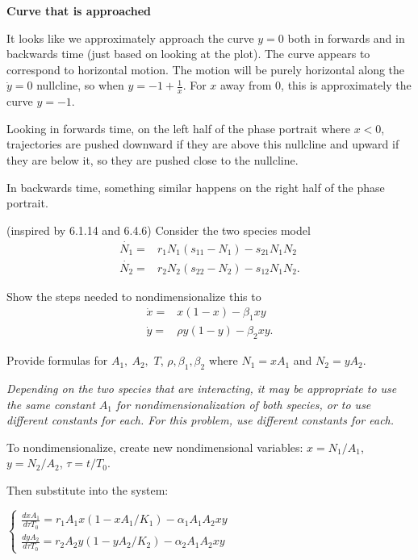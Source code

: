 \documentclass[12pt,letterpaper]{exam}
\begin{document}
\begin{questions}
\begin{parts}
\begin{solution}
\textbf{Curve that is approached}

It looks like we approximately approach the curve $y=0$ both in forwards and in backwards time (just based on looking at the plot).  The curve appears to correspond to horizontal motion.  The motion will be purely horizontal along the $\dot{y} = 0$ nullcline, so when $y = -1 + \frac{1}{x}$.  For $x$ away from $0$, this is approximately the curve $y = -1$.

Looking in forwards time, on the left half of the phase portrait where $ x < 0$, trajectories are pushed downward if they are above this nullcline and upward if they are below it, so they are pushed close to the nullcline.  

In backwards time, something similar happens on the right half of the phase portrait.


\end{solution}
\end{parts}

\question (inspired by 6.1.14 and 6.4.6) Consider the two species model \begin{align*}\dot{N_1} = & r_1 N_1 (s_{11}-N_1) - s_{21} N_1 N_2 \\ \dot{N_2} = & r_2 N_2(s_{22}-N_2) - s_{12} N_1N_2.\end{align*}

\begin{parts}
\item Show the steps needed to nondimensionalize this to 
\begin{align*}\dot{x} = &  x (1-x) - \beta_{1} x y \\ \dot{y} = & \rho y(1-y) - \beta_2 x y.\end{align*}

Provide formulas for $A_1, \ A_2,$ $T$, $\rho,\beta_1,\beta_2$ where $N_1 = xA_1$ and $N_2 = yA_2$.

\emph{Depending on the two species that are interacting, it may be appropriate to use the same constant $A_1$ for nondimensionalization of both species, or to use different constants for each.  For this problem, use different constants for each.}

\begin{solution}
To nondimensionalize, create new nondimensional variables: $x = N_1/A_1$, $y = N_2/A_2$, $\tau = t / T_0$.

Then substitute into the system: 

$\displaystyle\left\{\begin{array}{l} \frac{dxA_1}{d\tau T_0} =  r_1 A_1 x (1-x A_1/K_1) - \alpha_1 A_1 A_2 x y \\  \frac{dy A_2}{d\tau T_0} =  r_2 A_2 y(1-yA_2/K_2) - \alpha_2A_1 A_2 xy\end{array}\right.$


\end{solution}
\end{parts}
\end{questions}
\end{document}
